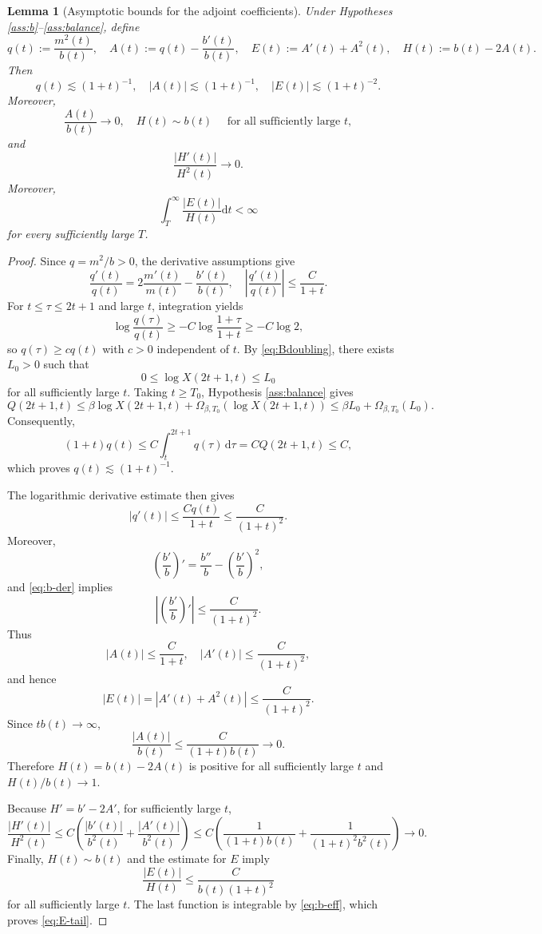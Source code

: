 \documentclass[11pt,reqno]{amsart}
\newtheorem{lemma}[theorem]{Lemma}
\theoremstyle{definition}
\theoremstyle{remark}
\begin{document}
	\begin{lemma}[Asymptotic bounds for the adjoint coefficients]
		\label{lem:AEH}
		Under Hypotheses \ref{ass:b}--\ref{ass:balance}, define
		\begin{equation}
			\label{eq:AEH}
			q(t):=\frac{m^2(t)}{b(t)},
			\quad
			A(t):=q(t)-\frac{b'(t)}{b(t)},
			\quad
			E(t):=A'(t)+A^2(t),
			\quad
			H(t):=b(t)-2A(t).
		\end{equation}
		Then
		$$
		q(t)\lesssim(1+t)^{-1},
		\quad
		|A(t)|\lesssim(1+t)^{-1},
		\quad
		|E(t)|\lesssim(1+t)^{-2}.
		$$
		Moreover,
		$$
		\frac{A(t)}{b(t)}\longrightarrow0,
		\quad
		H(t)\sim b(t)
		\quad \text{ for all sufficiently large } t,
		$$
		and
		$$
		\frac{|H'(t)|}{H^2(t)}\longrightarrow0.
		$$
		Moreover,
		\begin{equation}
			\label{eq:E-tail}
			\int_T^\infty\frac{|E(t)|}{H(t)}\mathrm{d}t<\infty
		\end{equation}
		for every sufficiently large $T$.
	\end{lemma}
	
	\begin{proof}
		Since $q=m^2/b>0$, the derivative assumptions give
		$$
		\frac{q'(t)}{q(t)}
		=2\frac{m'(t)}{m(t)}-\frac{b'(t)}{b(t)},
		\quad
		\left|\frac{q'(t)}{q(t)}\right|\leq\frac{C}{1+t}.
		$$
		For $t\leq\tau\leq2t+1$ and large $t$, integration yields
		$$
		\log\frac{q(\tau)}{q(t)}
		\geq-C\log\frac{1+\tau}{1+t}
		\geq-C\log2,
		$$
		so $q(\tau)\geq c q(t)$ with $c>0$ independent of $t$. By \eqref{eq:Bdoubling}, there exists $L_0>0$ such that
		$$
		0\leq\log X(2t+1,t)\leq L_0
		$$
		for all sufficiently large $t$. Taking $t\geq T_0$, Hypothesis \ref{ass:balance} gives
		$$
		Q(2t+1,t)
		\leq\beta\log X(2t+1,t)
		+\Omega_{\beta,T_0}(\log X(2t+1,t))
		\leq \beta L_0+\Omega_{\beta,T_0}(L_0).
		$$
		Consequently,
		$$
		(1+t)q(t)
		\leq C\int_t^{2t+1}q(\tau)\,\mathrm{d}\tau
		=C Q(2t+1,t)\leq C,
		$$
		which proves $q(t)\lesssim(1+t)^{-1}$.
		
		The logarithmic derivative estimate then gives
		$$
		|q'(t)|\leq\frac{Cq(t)}{1+t}\leq\frac{C}{(1+t)^2}.
		$$
		Moreover,
		$$
		\left(\frac{b'}{b}\right)'
		=\frac{b''}{b}-\left(\frac{b'}{b}\right)^2,
		$$
		and \eqref{eq:b-der} implies
		$$
		\left|\left(\frac{b'}{b}\right)'\right|\leq\frac{C}{(1+t)^2}.
		$$
		Thus
		$$
		|A(t)|\leq\frac{C}{1+t},
		\quad
		|A'(t)|\leq\frac{C}{(1+t)^2},
		$$
		and hence
		$$
		|E(t)|=|A'(t)+A^2(t)|\leq\frac{C}{(1+t)^2}.
		$$
		Since $tb(t)\to\infty$,
		$$
		\frac{|A(t)|}{b(t)}\leq\frac{C}{(1+t)b(t)}\longrightarrow0.
		$$
		Therefore $H(t)=b(t)-2A(t)$ is positive for all sufficiently large $t$ and $H(t)/b(t)\to1$.
		
		Because $H'=b'-2A'$, for sufficiently large $t$,
		$$
		\frac{|H'(t)|}{H^2(t)}
		\leq C\left(
		\frac{|b'(t)|}{b^2(t)}+\frac{|A'(t)|}{b^2(t)}
		\right)
		\leq C\left(
		\frac{1}{(1+t)b(t)}+\frac{1}{(1+t)^2b^2(t)}
		\right)\longrightarrow0.
		$$
		Finally, $H(t)\sim b(t)$ and the estimate for $E$ imply
		$$
		\frac{|E(t)|}{H(t)}\leq\frac{C}{b(t)(1+t)^2}
		$$
		for all sufficiently large $t$. The last function is integrable by \eqref{eq:b-eff}, which proves \eqref{eq:E-tail}.
	\end{proof}
	
\end{document}
